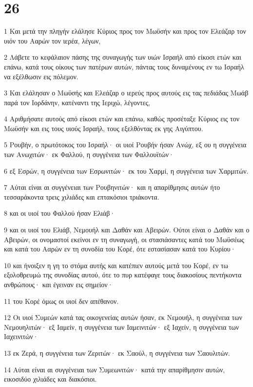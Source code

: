 \chapter{26}

\par 1 Και μετά την πληγήν ελάλησε Κύριος προς τον Μωϋσήν και προς τον Ελεάζαρ τον υιόν του Ααρών τον ιερέα, λέγων,
\par 2 Λάβετε το κεφάλαιον πάσης της συναγωγής των υιών Ισραήλ από είκοσι ετών και επάνω, κατά τους οίκους των πατέρων αυτών, πάντας τους δυναμένους εν τω Ισραήλ να εξέλθωσιν εις πόλεμον.
\par 3 Και ελάλησαν ο Μωϋσής και Ελεάζαρ ο ιερεύς προς αυτούς εις τας πεδιάδας Μωάβ παρά τον Ιορδάνην, κατέναντι της Ιεριχώ, λέγοντες,
\par 4 Αριθμήσατε αυτούς από είκοσι ετών και επάνω, καθώς προσέταξε Κύριος εις τον Μωϋσήν και εις τους υιούς Ισραήλ, τους εξελθόντας εκ γης Αιγύπτου.
\par 5 Ρουβήν, ο πρωτότοκος του Ισραήλ· οι υιοί Ρουβήν ήσαν Ανώχ, εξ ου η συγγένεια των Ανωχιτών· εκ Φαλλού, η συγγένεια των Φαλλουϊτών·
\par 6 εξ Εσρών, η συγγένεια των Εσρωνιτών· εκ του Χαρμί, η συγγένεια των Χαρμιτών.
\par 7 Αύται είναι αι συγγένειαι των Ρουβηνιτών· και η απαρίθμησις αυτών ήτο τεσσαράκοντα τρεις χιλιάδες και επτακόσιοι τριάκοντα.
\par 8 και οι υιοί του Φαλλού ήσαν Ελιάβ·
\par 9 και οι υιοί του Ελιάβ, Νεμουήλ και Δαθάν και Αβειρών. Ούτοι είναι ο Δαθάν και ο Αβειρών, οι ονομαστοί εκείνοι εν τη συναγωγή, οι στασιάσαντες κατά του Μωϋσέως και κατά του Ααρών εν τη συνοδία του Κορέ, ότε εστασίασαν κατά του Κυρίου·
\par 10 και ήνοιξεν η γη το στόμα αυτής και κατέπιεν αυτούς μετά του Κορέ, εν τω εξολοθρευμώ της συνοδίας αυτού, ότε το πυρ κατέφαγε τους διακοσίους πεντήκοντα ανθρώπους· και έγειναν εις σημείον·
\par 11 του Κορέ όμως οι υιοί δεν απέθανον.
\par 12 Οι υιοί Συμεών κατά τας οικογενείας αυτών ήσαν, εκ Νεμουήλ, η συγγένεια των Νεμουηλιτών· εξ Ιαμείν, η συγγένεια των Ιαμεινιτών· εξ Ιαχείν, η συγγένεια των Ιαχεινιτών·
\par 13 εκ Ζερά, η συγγένεια των Ζεριτών· εκ Σαούλ, η συγγένεια των Σαουλιτών.
\par 14 Αύται είναι αι συγγένειαι των Συμεωνιτών· κατά την απαρίθμησιν αυτών, εικοσιδύο χιλιάδες και διακόσιοι.
